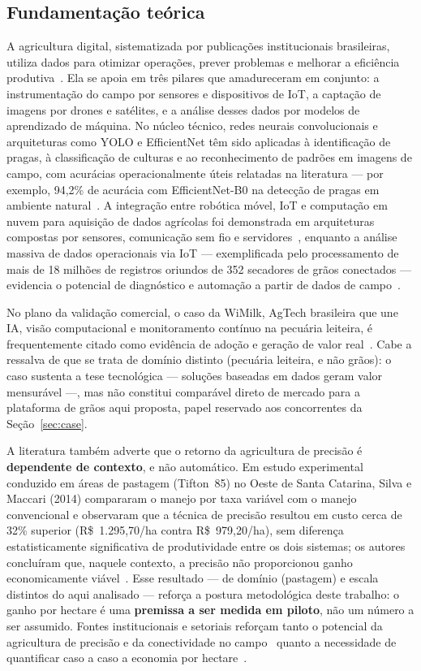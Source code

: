 \documentclass[conference]{IEEEtran}
\newcommand{\rs}{R\$}
\begin{document}
\subsection{Fundamentação teórica}
A agricultura digital, sistematizada por publicações institucionais brasileiras, utiliza dados para otimizar operações, prever problemas e melhorar a eficiência produtiva~\cite{embrapa_ia,bndes_iot}. Ela se apoia em três pilares que amadureceram em conjunto: a instrumentação do campo por sensores e dispositivos de IoT, a captação de imagens por drones e satélites, e a análise desses dados por modelos de aprendizado de máquina. No núcleo técnico, redes neurais convolucionais e arquiteturas como YOLO e EfficientNet têm sido aplicadas à identificação de pragas, à classificação de culturas e ao reconhecimento de padrões em imagens de campo, com acurácias operacionalmente úteis relatadas na literatura --- por exemplo, 94,2\% de acurácia com EfficientNet-B0 na detecção de pragas em ambiente natural~\cite{embrapa_vc,sbc_vc,artigo_efficientnet}. A integração entre robótica móvel, IoT e computação em nuvem para aquisição de dados agrícolas foi demonstrada em arquiteturas compostas por sensores, comunicação sem fio e servidores~\cite{durmus_iot}, enquanto a análise massiva de dados operacionais via IoT --- exemplificada pelo processamento de mais de 18 milhões de registros oriundos de 352 secadores de grãos conectados --- evidencia o potencial de diagnóstico e automação a partir de dados de campo~\cite{sodebras}.

No plano da validação comercial, o caso da WiMilk, AgTech brasileira que une IA, visão computacional e monitoramento contínuo na pecuária leiteira, é frequentemente citado como evidência de adoção e geração de valor real~\cite{wimilk}. Cabe a ressalva de que se trata de domínio distinto (pecuária leiteira, e não grãos): o caso sustenta a tese tecnológica --- soluções baseadas em dados geram valor mensurável ---, mas não constitui comparável direto de mercado para a plataforma de grãos aqui proposta, papel reservado aos concorrentes da Seção~\ref{sec:case}.

A literatura também adverte que o retorno da agricultura de precisão é \textbf{dependente de contexto}, e não automático. Em estudo experimental conduzido em áreas de pastagem (Tifton~85) no Oeste de Santa Catarina, Silva e Maccari (2014) compararam o manejo por taxa variável com o manejo convencional e observaram que a técnica de precisão resultou em custo cerca de 32\% superior (\rs~1.295,70/ha contra \rs~979,20/ha), sem diferença estatisticamente significativa de produtividade entre os dois sistemas; os autores concluíram que, naquele contexto, a precisão não proporcionou ganho economicamente viável~\cite{silva_maccari}. Esse resultado --- de domínio (pastagem) e escala distintos do aqui analisado --- reforça a postura metodológica deste trabalho: o ganho por hectare é uma \textbf{premissa a ser medida em piloto}, não um número a ser assumido. Fontes institucionais e setoriais reforçam tanto o potencial da agricultura de precisão e da conectividade no campo~\cite{embrapa_ap_cana,fapesp_drone,fundaj_drones} quanto a necessidade de quantificar caso a caso a economia por hectare~\cite{canalrural_178}.
\end{document}
